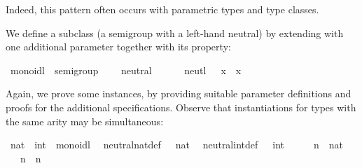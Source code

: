 \begin{isabellebody}
\begin{isamarkuptext}
  Indeed, this pattern often occurs with parametric types
  and type classes.%
\end{isamarkuptext}%
\isamarkuptrue%
%
\isamarkuptrue%
%
\begin{isamarkuptext}%
We define a subclass  (a semigroup with a left-hand neutral)
  by extending 
  with one additional parameter  together
  with its property:%
\end{isamarkuptext}%
\isamarkuptrue%
%
\isadelimquote
%
\endisadelimquote
%
\isatagquote
{}\isamarkupfalse%
\ monoidl\ {\isacharequal}\ semigroup\ {\isacharplus}\isanewline
\ \ \ neutral\ {\isacharcolon}{\isacharcolon}\ {\isachardoublequoteopen}{\isasymalpha}{\isachardoublequoteclose}\ {\isacharparenleft}{\isachardoublequoteopen}{\isasymone}{\isachardoublequoteclose}{\isacharparenright}\isanewline
\ \ \ neutl{\isacharcolon}\ {\isachardoublequoteopen}{\isasymone}\ {\isasymotimes}\ x\ {\isacharequal}\ x{\isachardoublequoteclose}%
\endisatagquote
{\isafoldquote}%
%
\isadelimquote
%
\endisadelimquote
%
\begin{isamarkuptext}%
\noindent Again, we prove some instances, by
  providing suitable parameter definitions and proofs for the
  additional specifications.  Observe that instantiations
  for types with the same arity may be simultaneous:%
\end{isamarkuptext}%
\isamarkuptrue%
%
\isadelimquote
%
\endisadelimquote
%
\isatagquote
{}\isamarkupfalse%
\ nat\ \ int\ {\isacharcolon}{\isacharcolon}\ monoidl\isanewline
{}\isanewline
\isanewline
{}\isamarkupfalse%
\isanewline
\ \ neutral{\isacharunderscore}nat{\isacharunderscore}def{\isacharcolon}\ {\isachardoublequoteopen}{\isasymone}\ {\isacharequal}\ {\isacharparenleft}{}{\isasymColon}nat{\isacharparenright}{\isachardoublequoteclose}\isanewline
\isanewline
{}\isamarkupfalse%
\isanewline
\ \ neutral{\isacharunderscore}int{\isacharunderscore}def{\isacharcolon}\ {\isachardoublequoteopen}{\isasymone}\ {\isacharequal}\ {\isacharparenleft}{}{\isasymColon}int{\isacharparenright}{\isachardoublequoteclose}\isanewline
\isanewline
{}\isamarkupfalse%
\ \isamarkupfalse%
\isanewline
\ \ \isamarkupfalse%
\ n\ {\isacharcolon}{\isacharcolon}\ nat\isanewline
\ \ \isamarkupfalse%
\ {\isachardoublequoteopen}{\isasymone}\ {\isasymotimes}\ n\ {\isacharequal}\ n{\isachardoublequoteclose}\isanewline

\end{isabellebody}
